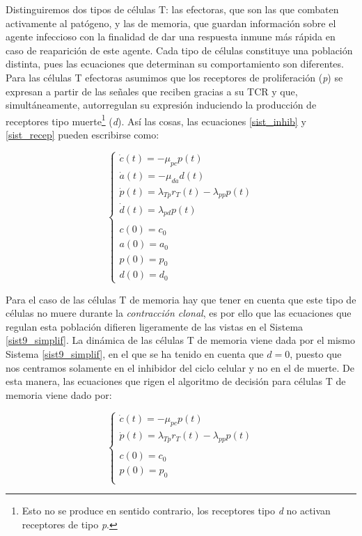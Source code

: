 Distinguiremos dos tipos de células T: las efectoras, que son las que combaten activamente al patógeno, y las de memoria, que guardan información sobre el agente infeccioso con la finalidad de dar una respuesta inmune más rápida en caso de reaparición de este agente. Cada tipo de células constituye una población distinta, pues las ecuaciones que determinan su comportamiento son diferentes. Para las células T efectoras asumimos que los receptores de proliferación (\textit{p}) se expresan a partir de las señales que reciben gracias a su TCR y que, simultáneamente, autorregulan su expresión induciendo la producción de receptores tipo muerte\footnote{Esto no se produce en sentido contrario, los receptores tipo \textit{d} no activan receptores de tipo \textit{p}.} (\textit{d}). Así las cosas, las ecuaciones \ref{sist_inhib} y \ref{sist_recep} pueden escribirse como:

\begin{equation}
	\label{sist9_simplif}
	\left\{ \begin{array}{l}
	\dot{c}(t) = -\mu_{pc}p(t) \\
	\dot{a}(t) = -\mu_{da}d(t)  \\
	\dot{p}(t) = \lambda_{Tp}r_{T}(t) - \lambda_{pp}p(t) \\
	\dot{d}(t) = \lambda_{pd}p(t) \\
	\\
	c(0)=c_0 \\
	a(0)=a_0 \\
	p(0)=p_0 \\
	d(0)=d_0 
	\end{array}
	\right.
\end{equation}

Para el caso de las células T de memoria hay que tener en cuenta que este tipo de células no muere durante la \textit{contracción clonal}, es por ello que las ecuaciones que regulan esta población difieren ligeramente de las vistas en el Sistema \ref{sist9_simplif}. La dinámica de las células T de memoria viene dada por el mismo Sistema \ref{sist9_simplif}, en el que se ha tenido en cuenta que $d=0$, puesto que nos centramos solamente en el inhibidor del ciclo celular y no en el de muerte. De esta manera, las ecuaciones que rigen el algoritmo de decisión para células T de memoria viene dado por: 

\begin{equation}
	\label{sist15_simplif}
	\left\{ \begin{array}{l}
	\dot{c}(t) = -\mu_{pc}p(t) \\
	\dot{p}(t) = \lambda_{Tp}r_{T}(t) - \lambda_{pp}p(t) \\
	\\
	c(0)=c_0 \\
	p(0)=p_0 \\
	\end{array}
	\right.
\end{equation}

